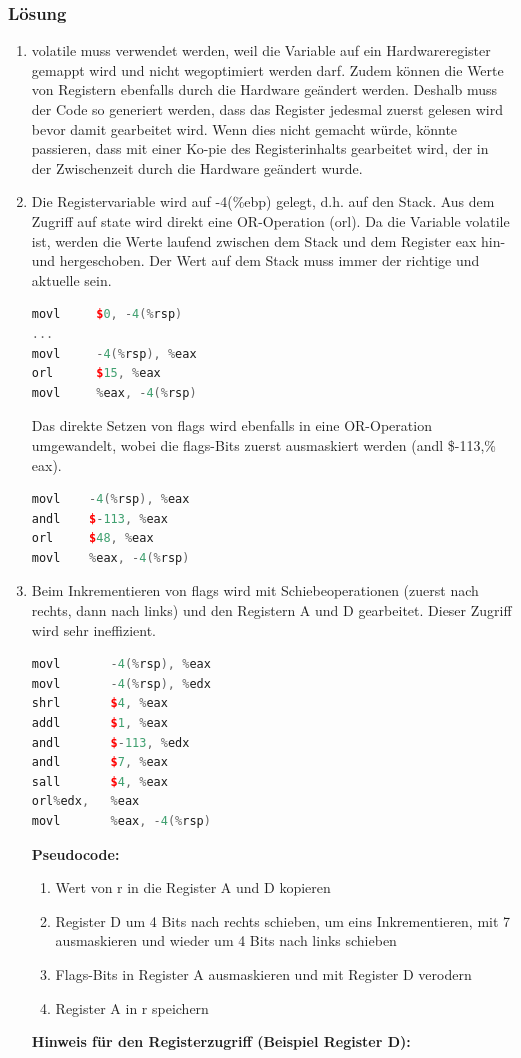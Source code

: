 \subsubsection{Lösung}

\begin{enumerate}
  \item volatile muss verwendet werden, weil die Variable auf ein Hardwareregister gemappt wird und nicht wegoptimiert werden darf. Zudem können die Werte von Registern ebenfalls durch die Hardware geändert werden. Deshalb muss der Code so generiert werden, dass das Register jedesmal zuerst gelesen wird bevor damit gearbeitet wird. Wenn dies nicht gemacht würde, könnte passieren, dass mit einer Ko-pie des Registerinhalts gearbeitet wird, der in der Zwischenzeit durch die Hardware geändert wurde.
  

\item Die Registervariable wird auf -4(\%ebp) gelegt, d.h. auf den Stack. Aus dem Zugriff auf state wird direkt eine OR-Operation (orl). Da die Variable volatile ist, werden die Werte laufend zwischen dem Stack und dem Register eax hin- und hergeschoben. Der Wert auf dem Stack muss immer der richtige und aktuelle sein.
\begin{lstlisting}[language=C++, style=C++]
movl     $0, -4(%rsp)
...
movl     -4(%rsp), %eax
orl      $15, %eax
movl     %eax, -4(%rsp)
\end{lstlisting}
Das direkte Setzen von flags wird ebenfalls in eine OR-Operation umgewandelt, wobei die flags-Bits zuerst ausmaskiert werden (andl \$-113,\% eax).
\begin{lstlisting}[language=C++, style=C++]
movl    -4(%rsp), %eax
andl    $-113, %eax
orl     $48, %eax
movl    %eax, -4(%rsp)
\end{lstlisting}
\item Beim Inkrementieren von flags wird mit Schiebeoperationen (zuerst nach rechts, dann nach links) und den Registern A und D gearbeitet. Dieser Zugriff wird sehr ineffizient.
\begin{lstlisting}[language=C++, style=C++]
movl       -4(%rsp), %eax
movl       -4(%rsp), %edx
shrl       $4, %eax
addl       $1, %eax
andl       $-113, %edx
andl       $7, %eax
sall       $4, %eax
orl%edx,   %eax
movl       %eax, -4(%rsp)
\end{lstlisting}
\textbf{Pseudocode:}
\begin{enumerate}
  \item  Wert von r in die Register A und D kopieren
    \item Register D um 4 Bits nach rechts schieben, um eins Inkrementieren, mit 7 ausmaskieren und wieder um 4 Bits nach links schieben
    \item Flags-Bits in Register A ausmaskieren und mit Register D verodern
    \item Register A in r speichern
\end{enumerate}
\textbf{Hinweis für den Registerzugriff (Beispiel Register D):}


\end{enumerate}
